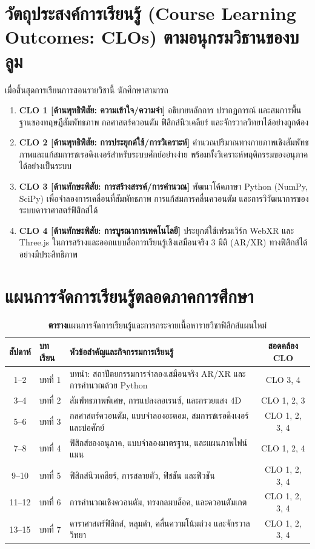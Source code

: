 \section*{วัตถุประสงค์การเรียนรู้ (Course Learning Outcomes: CLOs) ตามอนุกรมวิธานของบลูม}
เมื่อสิ้นสุดการเรียนการสอนรายวิชานี้ นักศึกษาสามารถ
\begin{enumerate}
    \item \textbf{CLO 1 [ด้านพุทธิพิสัย: ความเข้าใจ/ความจำ]} อธิบายหลักการ ปรากฏการณ์ และสมการพื้นฐานของทฤษฎีสัมพัทธภาพ กลศาสตร์ควอนตัม ฟิสิกส์นิวเคลียร์ และจักรวาลวิทยาได้อย่างถูกต้อง
    \item \textbf{CLO 2 [ด้านพุทธิพิสัย: การประยุกต์ใช้/การวิเคราะห์]} คำนวณปริมาณทางกายภาพเชิงสัมพัทธภาพและแก้สมการชเรอดิงเงอร์สำหรับระบบศักย์อย่างง่าย พร้อมทั้งวิเคราะห์พฤติกรรมของอนุภาคได้อย่างเป็นระบบ
    \item \textbf{CLO 3 [ด้านทักษะพิสัย: การสร้างสรรค์/การคำนวณ]} พัฒนาโค้ดภาษา Python (NumPy, SciPy) เพื่อจำลองการเคลื่อนที่สัมพัทธภาพ การแก้สมการคลื่นควอนตัม และการวิวัฒนาการของระบบดาราศาสตร์ฟิสิกส์ได้
    \item \textbf{CLO 4 [ด้านทักษะพิสัย: การบูรณาการเทคโนโลยี]} ประยุกต์ใช้เฟรมเวิร์ก WebXR และ Three.js ในการสร้างและออกแบบสื่อการเรียนรู้เชิงเสมือนจริง 3 มิติ (AR/XR) ทางฟิสิกส์ได้อย่างมีประสิทธิภาพ
\end{enumerate}

\section*{แผนการจัดการเรียนรู้ตลอดภาคการศึกษา}
\begin{table}[H]
\centering
\caption*{\textbf{ตาราง}\quad แผนการจัดการเรียนรู้และการกระจายเนื้อหารายวิชาฟิสิกส์แผนใหม่}
\label{tab:modern_syllabus_map}
\small
\begin{tabularx}{\textwidth}{clp{7.5cm}c}
\toprule
\textbf{สัปดาห์} & \textbf{บทเรียน} & \textbf{หัวข้อสำคัญและกิจกรรมการเรียนรู้} & \textbf{สอดคล้อง CLO} \\
\midrule
1--2 & บทที่ 1 & บทนำ: สถาปัตยกรรมการจำลองเสมือนจริง AR/XR และการคำนวณด้วย Python & CLO 3, 4 \\
3--4 & บทที่ 2 & สัมพัทธภาพพิเศษ, การแปลงลอเรนซ์, และกรวยแสง 4D & CLO 1, 2, 3 \\
5--6 & บทที่ 3 & กลศาสตร์ควอนตัม, แบบจำลองอะตอม, สมการชเรอดิงเงอร์ และบ่อศักย์ & CLO 1, 2, 3, 4 \\
7--8 & บทที่ 4 & ฟิสิกส์ของอนุภาค, แบบจำลองมาตรฐาน, และแผนภาพไฟน์แมน & CLO 1, 2, 4 \\
9--10 & บทที่ 5 & ฟิสิกส์นิวเคลียร์, การสลายตัว, ฟิชชัน และฟิวชัน & CLO 1, 2, 3, 4 \\
11--12 & บทที่ 6 & การคำนวณเชิงควอนตัม, ทรงกลมบล็อค, และควอนตัมเกต & CLO 1, 2, 3, 4 \\
13--15 & บทที่ 7 & ดาราศาสตร์ฟิสิกส์, หลุมดำ, คลื่นความโน้มถ่วง และจักรวาลวิทยา & CLO 1, 2, 3, 4 \\
\bottomrule
\end{tabularx}
\end{table}

